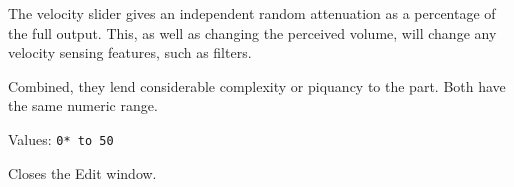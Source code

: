    The velocity slider gives an independent random attenuation as a percentage of
   the full output. This, as well as changing the perceived volume, will change any
   velocity sensing features, such as filters.

   Combined, they lend considerable complexity or piquancy to the part. Both have the same
   numeric range.

   Values: \texttt{0* to 50}

   Closes the Edit window.

